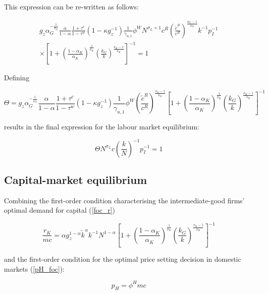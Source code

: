 \documentclass[a4paper,11pt]{article}
\numberwithin{equation}{section}
\begin{document}
	This expression can be re-written as follows:
	
	\begin{equation}
	\begin{split}
	g_z\alpha_G^{-\frac{1}{\nu_G}}\frac{\alpha}{1-\alpha}\frac{1+\tau^c}{1-\tau^w}\left(1-\kappa g_z^{-1}\right)\frac{1}{\gamma_{u,1}}\phi^W N^{\sigma_L+1}c^R\left(\frac{\tilde{c}^R}{c^R}\right)^{\frac{\nu_G-1}{\nu_G}}k^{-1}p_I^{-1}\\
	\times\left[1+\left(\frac{1-\alpha_K}{\alpha_K}\right)^{\frac{1}{\nu_K}}\left(\frac{k_G}{k}\right)^{\frac{\nu_K-1}{\nu_K}}\right]^{-1}=1
	\end{split}
	\end{equation}
	
	Defining
	
	\begin{equation}
	\Theta=g_z\alpha_G^{-\frac{1}{\nu_G}}\frac{\alpha}{1-\alpha}\frac{1+\tau^c}{1-\tau^w}\left(1-\kappa g_z^{-1}\right)\frac{1}{\gamma_{u,1}}\phi^W\left(\frac{\tilde{c}^R}{c^R}\right)^{\frac{\nu_G-1}{\nu_G}}\left[1+\left(\frac{1-\alpha_K}{\alpha_K}\right)^{\frac{1}{\nu_K}}\left(\frac{k_G}{k}\right)^{\frac{\nu_K-1}{\nu_K}}\right]^{-1}
	\end{equation}
	
	results in the final expression for the labour market equilibrium:
	
	\begin{equation} \label{ss_labour}
	\Theta N^{\sigma_L}c\left(\frac{k}{N}\right)^{-1}p_I^{-1}=1
	\end{equation}
	
	\subsection{Capital-market equilibrium}
	
	Combining the first-order condition characterising the intermediate-good firms' optimal demand for capital (\ref{foc_r})
	
	\begin{equation}
	\frac{r_K}{mc}=\alpha g_z^{1-\alpha}\tilde{k}^{\alpha}k^{-1}N^{1-\alpha}\left[1+\left(\frac{1-\alpha_K}{\alpha_K}\right)^{\frac{1}{\nu_K}}\left(\frac{k_G}{k}\right)^{\frac{\nu_K-1}{\nu_K}}\right]^{-1}
	\end{equation}
	
	and the first-order condition for the optimal price setting decision in domestic markets (\ref{pH_foc}):
	
	\begin{equation}
	p_H=\phi^Hmc
	\end{equation}
	
\end{document}
